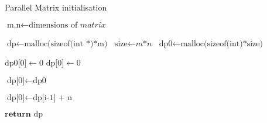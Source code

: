 \begin{algorithm}
	\caption{Parallel Matrix initialisation}\label{alg:parnewmatrix}
	\begin{algorithmic}[3]
		\State $\text{m,n} \gets \text{dimensions of }\textit{matrix}$

		\State $\text{dp} \gets \text{malloc(sizeof(int *)*m)}$
		\State $\text{size} \gets \textit{m*n}$
		\State $\text{dp0} \gets \text{malloc(sizeof(int)*size)}$
		
		\For{$\text{i} \gets [0 \ldots \text{size}) \textbf{ parallel} $}
			\State $\text{dp0[0]} \gets 0$
		\EndFor
		\For{$\text{i} \gets [0 \ldots m) \textbf{ parallel} $}
			\State $\text{dp[0]} \gets 0$
		\EndFor
		
		\State $\text{dp[0]} \gets \text{dp0}$
		
		\For{$\text{i} \gets [1 \ldots m) $}
		\State $\text{dp[0]} \gets \text{dp[i-1] + n}$
		\EndFor
		
		\State $\textbf{return } \text{dp}$
		\EndProcedure
	\end{algorithmic}
\end{algorithm}